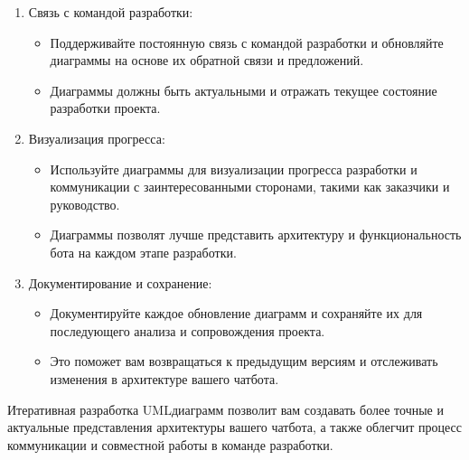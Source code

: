 \documentclass[letterpaper,10pt,russian]{sphinxmanual}
\begin{document}
\begin{enumerate}
\begin{itemize}
\end{itemize}

\item {} 
\sphinxAtStartPar
Связь с командой разработки:
\begin{itemize}
\item {} 
\sphinxAtStartPar
Поддерживайте постоянную связь с командой разработки и обновляйте диаграммы на основе их обратной связи и предложений.

\item {} 
\sphinxAtStartPar
Диаграммы должны быть актуальными и отражать текущее состояние разработки проекта.

\end{itemize}

\item {} 
\sphinxAtStartPar
Визуализация прогресса:
\begin{itemize}
\item {} 
\sphinxAtStartPar
Используйте диаграммы для визуализации прогресса разработки и коммуникации с заинтересованными сторонами, такими как заказчики и руководство.

\item {} 
\sphinxAtStartPar
Диаграммы позволят лучше представить архитектуру и функциональность бота на каждом этапе разработки.

\end{itemize}

\item {} 
\sphinxAtStartPar
Документирование и сохранение:
\begin{itemize}
\item {} 
\sphinxAtStartPar
Документируйте каждое обновление диаграмм и сохраняйте их для последующего анализа и сопровождения проекта.

\item {} 
\sphinxAtStartPar
Это поможет вам возвращаться к предыдущим версиям и отслеживать изменения в архитектуре вашего чат\sphinxhyphen{}бота.

\end{itemize}

\end{enumerate}

\sphinxAtStartPar
Итеративная разработка UML\sphinxhyphen{}диаграмм позволит вам создавать более точные и актуальные представления архитектуры вашего чат\sphinxhyphen{}бота, а также облегчит процесс коммуникации и совместной работы в команде разработки.
\end{document}
